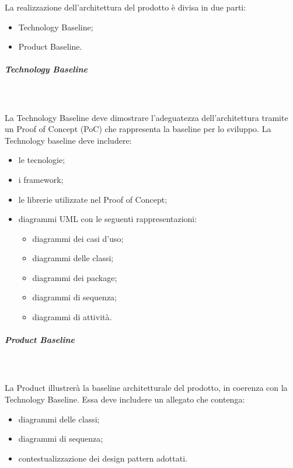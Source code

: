 La realizzazione dell’architettura del prodotto è divisa in due parti:
\begin{itemize}
	\item Technology Baseline;
	\item Product Baseline.
\end{itemize}

\subparagraph{Technology Baseline}\mbox{}\\ \\
La Technology Baseline deve dimostrare l’adeguatezza dell’architettura tramite un Proof of Concept (PoC) che rappresenta la baseline per lo sviluppo. 
La Technology baseline deve includere:
\begin{itemize}
	\item le tecnologie;
	\item i framework;
	\item le librerie utilizzate nel Proof of Concept;
	\item diagrammi UML con le seguenti rappresentazioni:
	\begin{itemize}
		\item diagrammi dei casi d'uso; 
		\item diagrammi delle classi; 
		\item diagrammi dei package;
		\item diagrammi di sequenza; 
		\item diagrammi di attività.
	\end{itemize}
\end{itemize}

\subparagraph{Product Baseline}\mbox{}\\ \\
La Product  illustrerà la baseline architetturale del prodotto, in coerenza con la Technology Baseline.
Essa deve includere un allegato che contenga:
\begin{itemize}
	\item diagrammi delle classi;
	\item diagrammi di sequenza;
	\item contestualizzazione dei design pattern adottati.	
\end{itemize}

